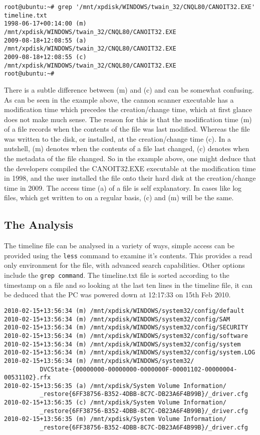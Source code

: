 \documentclass[a4paper,
    11pt,
    normalheadings,
    parindent,
    UKenglish,
    abstracton,
    ]{scrartcl}
\begin{document}
\begin{verbatim}
root@ubuntu:~# grep '/mnt/xpdisk/WINDOWS/twain_32/CNQL80/CANOIT32.EXE' timeline.txt
1998-06-17+00:14:00 (m) /mnt/xpdisk/WINDOWS/twain_32/CNQL80/CANOIT32.EXE
2009-08-18+12:08:55 (a) /mnt/xpdisk/WINDOWS/twain_32/CNQL80/CANOIT32.EXE
2009-08-18+12:08:55 (c) /mnt/xpdisk/WINDOWS/twain_32/CNQL80/CANOIT32.EXE
root@ubuntu:~#
\end{verbatim}

There is a subtle difference between (m) and (c) and can be somewhat confusing.
As can be seen in the example above, the cannon scanner executable has a modification time which precedes the creation/change time, which at first glance does not make much sense.
The reason for this is that the modification time (m) of a file records when the contents of the file was last modified.
Whereas the file was written to the disk, or installed, at the creation/change time (c).
In a nutshell, (m) denotes when the contents of a file last changed, (c) denotes when the metadata of the file changed.
So in the example above, one might deduce that the developers compiled the CANOIT32.EXE executable at the modification time in 1998, and the user installed the file onto their hard disk at the creation/change time in 2009.
The access time (a) of a file is self explanatory.
In cases like log files, which get written to on a regular basis, (c) and (m) will be the same.

\subsection{The Analysis}

The timeline file can be analysed in a variety of ways, simple access can be provided using the {\tt less} command to examine it's contents.
This provides a read only environment for the file, with advanced search capabilities.
Other options include the {\tt grep command}.
The timeline.txt file is sorted according to the timestamp on a file and so looking at the last ten lines in the timeline file, it can be deduced that the PC was powered down at 12:17:33 on 15th Feb 2010.

\begin{verbatim}
2010-02-15+13:56:34 (m) /mnt/xpdisk/WINDOWS/system32/config/default
2010-02-15+13:56:34 (m) /mnt/xpdisk/WINDOWS/system32/config/SAM
2010-02-15+13:56:34 (m) /mnt/xpdisk/WINDOWS/system32/config/SECURITY
2010-02-15+13:56:34 (m) /mnt/xpdisk/WINDOWS/system32/config/software
2010-02-15+13:56:34 (m) /mnt/xpdisk/WINDOWS/system32/config/system
2010-02-15+13:56:34 (m) /mnt/xpdisk/WINDOWS/system32/config/system.LOG
2010-02-15+13:56:34 (m) /mnt/xpdisk/WINDOWS/system32/
          DVCState-{00000000-00000000-0000000F-00001102-00000004-00531102}.rfx
2010-02-15+13:56:35 (a) /mnt/xpdisk/System Volume Information/
          _restore{6FF38756-B352-4DBB-8C7C-DB23A6F4B99B}/_driver.cfg
2010-02-15+13:56:35 (c) /mnt/xpdisk/System Volume Information/
          _restore{6FF38756-B352-4DBB-8C7C-DB23A6F4B99B}/_driver.cfg
2010-02-15+13:56:35 (m) /mnt/xpdisk/System Volume Information/
          _restore{6FF38756-B352-4DBB-8C7C-DB23A6F4B99B}/_driver.cfg
\end{verbatim}
\end{document}
